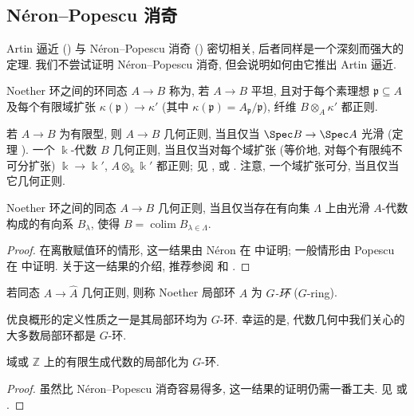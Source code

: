 \subsection{Néron--Popescu 消奇}\label{src:B.5.4-subsection}
Artin 逼近 () 与 Néron--Popescu 消奇 () 密切相关, 后者同样是一个深刻而强大的定理. 我们不尝试证明 Néron--Popescu 消奇, 但会说明如何由它推出 Artin 逼近.
\begin{definition}\label{src:B.5.14}
Noether 环之间的环同态 $A\to B$ 称为, 若 $A\to B$ 平坦, 且对于每个素理想 $\mathfrak p\subseteq A$ 及每个有限域扩张 $\kappa(\mathfrak p)\to\kappa'$ (其中 $\kappa(\mathfrak p)=A_{\mathfrak p}/\mathfrak p$), 纤维 $B\otimes_A\kappa'$ 都正则.
\end{definition}
若 $A\to B$ 为有限型, 则 $A\to B$ 几何正则, 当且仅当 $\Spec B\to\Spec A$ 光滑 (定理 ). 一个 $\Bbbk$-代数 $B$ 几何正则, 当且仅当对每个域扩张 (等价地, 对每个有限纯不可分扩张) $\Bbbk\to\Bbbk'$, $A\otimes_{\Bbbk}\Bbbk'$ 都正则; 见 \cite[$\mathrm{IV}_2.6.7.8$]{EGA}, \cite[定理 $23.7$]{Mat89} 或 \cite[Tag 0381]{SP}. 注意, 一个域扩张可分, 当且仅当它几何正则.
\begin{theorem}\label{src:B.5.15}
Noether 环之间的同态 $A\to B$ 几何正则, 当且仅当存在有向集 $\Lambda$ 上由光滑 $A$-代数构成的有向系 $B_\lambda$, 使得 $B=\operatorname{colim}B_{\lambda\in\Lambda}$.
\end{theorem}
\begin{proof}
在离散赋值环的情形, 这一结果由 Néron 在 \cite{Nér64} 中证明; 一般情形由 Popescu 在 \cite{Pop85,Pop86,Pop90} 中证明. 关于这一结果的介绍, 推荐参阅 \cite{Swa98} 和 \cite[Tag 07GC]{SP}.
\end{proof}
\begin{definition}\label{src:B.5.16}
若同态 $A\to\widehat A$ 几何正则, 则称 Noether 局部环 $A$ 为 \textit{$G$-环} (\textup{$G$-ring}).
\end{definition}
优良概形的定义性质之一是其局部环均为 $G$-环. 幸运的是, 代数几何中我们关心的大多数局部环都是 $G$-环.
\begin{theorem}\label{src:B.5.17}
域或 $\mathbb Z$ 上的有限生成代数的局部化为 $G$-环.
\end{theorem}
\begin{proof}
虽然比 Néron--Popescu 消奇容易得多, 这一结果的证明仍需一番工夫. 见 \cite[$\mathrm{IV}.7.4.4$]{EGA} 或 \cite[Tag 07PX]{SP}.
\end{proof}

